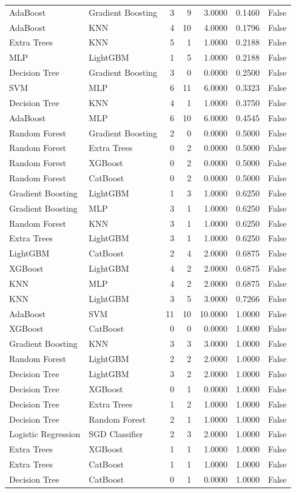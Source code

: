 \begin{table}
\begin{tabular}{llrrrrr}
AdaBoost & Gradient Boosting & 3 & 9 & 3.0000 & 0.1460 & False \\
AdaBoost & KNN & 4 & 10 & 4.0000 & 0.1796 & False \\
Extra Trees & KNN & 5 & 1 & 1.0000 & 0.2188 & False \\
MLP & LightGBM & 1 & 5 & 1.0000 & 0.2188 & False \\
Decision Tree & Gradient Boosting & 3 & 0 & 0.0000 & 0.2500 & False \\
SVM & MLP & 6 & 11 & 6.0000 & 0.3323 & False \\
Decision Tree & KNN & 4 & 1 & 1.0000 & 0.3750 & False \\
AdaBoost & MLP & 6 & 10 & 6.0000 & 0.4545 & False \\
Random Forest & Gradient Boosting & 2 & 0 & 0.0000 & 0.5000 & False \\
Random Forest & Extra Trees & 0 & 2 & 0.0000 & 0.5000 & False \\
Random Forest & XGBoost & 0 & 2 & 0.0000 & 0.5000 & False \\
Random Forest & CatBoost & 0 & 2 & 0.0000 & 0.5000 & False \\
Gradient Boosting & LightGBM & 1 & 3 & 1.0000 & 0.6250 & False \\
Gradient Boosting & MLP & 3 & 1 & 1.0000 & 0.6250 & False \\
Random Forest & KNN & 3 & 1 & 1.0000 & 0.6250 & False \\
Extra Trees & LightGBM & 3 & 1 & 1.0000 & 0.6250 & False \\
LightGBM & CatBoost & 2 & 4 & 2.0000 & 0.6875 & False \\
XGBoost & LightGBM & 4 & 2 & 2.0000 & 0.6875 & False \\
KNN & MLP & 4 & 2 & 2.0000 & 0.6875 & False \\
KNN & LightGBM & 3 & 5 & 3.0000 & 0.7266 & False \\
AdaBoost & SVM & 11 & 10 & 10.0000 & 1.0000 & False \\
XGBoost & CatBoost & 0 & 0 & 0.0000 & 1.0000 & False \\
Gradient Boosting & KNN & 3 & 3 & 3.0000 & 1.0000 & False \\
Random Forest & LightGBM & 2 & 2 & 2.0000 & 1.0000 & False \\
Decision Tree & LightGBM & 3 & 2 & 2.0000 & 1.0000 & False \\
Decision Tree & XGBoost & 0 & 1 & 0.0000 & 1.0000 & False \\
Decision Tree & Extra Trees & 1 & 2 & 1.0000 & 1.0000 & False \\
Decision Tree & Random Forest & 2 & 1 & 1.0000 & 1.0000 & False \\
Logistic Regression & SGD Classifier & 2 & 3 & 2.0000 & 1.0000 & False \\
Extra Trees & XGBoost & 1 & 1 & 1.0000 & 1.0000 & False \\
Extra Trees & CatBoost & 1 & 1 & 1.0000 & 1.0000 & False \\
Decision Tree & CatBoost & 0 & 1 & 0.0000 & 1.0000 & False \\
\bottomrule
\end{tabular}
\end{table}
